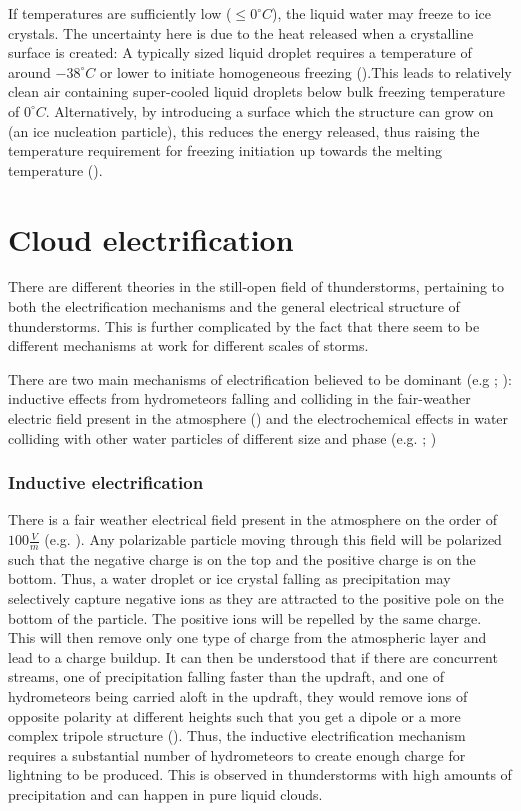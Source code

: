 If temperatures are sufficiently low ($\leq 0 ^{\circ} C$), the liquid water may freeze to ice crystals. The uncertainty here is due to the heat released when a crystalline surface is created: A typically sized liquid droplet requires a temperature of around $ -38 ^{\circ} C$ or lower to initiate homogeneous freezing (\cite{Skyfysikk}).This leads to relatively clean air containing super-cooled liquid droplets below bulk freezing temperature of $0 ^{\circ} C$. Alternatively, by introducing a surface which the structure can grow on (an ice nucleation particle), this reduces the energy released, thus raising the temperature requirement for freezing initiation up towards the melting temperature (\cite{jeffery1997}). 

\section{Cloud electrification}

There are different theories in the still-open field of thunderstorms, pertaining to both the electrification mechanisms and the general electrical structure of thunderstorms. This is further complicated by the fact that there seem to be different mechanisms at work for different scales of storms.

There are two main mechanisms of electrification believed to be dominant (e.g \cite{saunders2008}; \cite{soula2012}): inductive effects from hydrometeors falling and colliding in the fair-weather electric field present in the atmosphere (\cite{harrison2012}) and the electrochemical effects in water colliding with other water particles of different size and phase (e.g. \cite{rydock1991}; \cite{kallay2015})

\subsubsection{Inductive electrification}

There is a fair weather electrical field present in the atmosphere on the order of $100 \frac{V}{m}$ (e.g. \cite{harrison2012}). Any polarizable particle moving through this field will be polarized such that the negative charge is on the top and the positive charge is on the bottom. Thus, a water droplet or ice crystal falling as precipitation may selectively capture negative ions as they are attracted to the positive pole on the bottom of the particle. The positive ions will be repelled by the same charge. This will then remove only one type of charge from the atmospheric layer and lead to a charge buildup. It can then be understood that if there are concurrent streams, one of precipitation falling faster than the updraft, and one of hydrometeors being carried aloft in the updraft, they would remove ions of opposite polarity at different heights such that you get a dipole or a more complex tripole structure (\cite{stolzenburg1998c}). Thus, the inductive electrification mechanism requires a substantial number of hydrometeors to create enough charge for lightning to be produced. This is observed in thunderstorms with high amounts of precipitation and can happen in pure liquid clouds.

